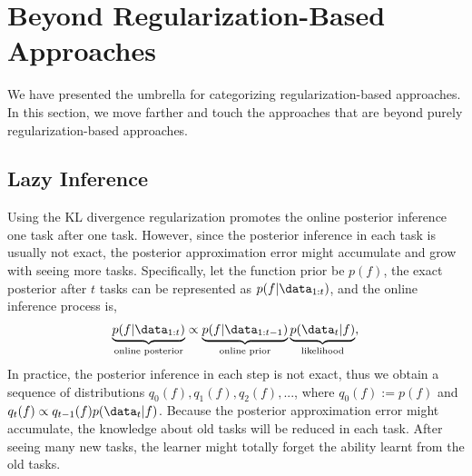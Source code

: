 \section{Beyond Regularization-Based Approaches}
We have presented the umbrella for categorizing regularization-based approaches. In this section, we move farther and touch the approaches that are beyond purely regularization-based approaches. 

\subsection{Lazy Inference}
Using the KL divergence regularization promotes the online posterior inference one task after one task. However, since the posterior inference in each task is usually not exact, the posterior approximation error might accumulate and grow with seeing more tasks. Specifically, let the function prior be $p(f)$, the exact posterior after $t$ tasks can be represented as $p(f | \data_{1:t})$, and the online inference process is,
\begin{align}
    \underbrace{p(f | \data_{1:t})}_{\text{online posterior}} \propto \underbrace{p(f | \data_{1:t-1})}_{\text{online prior}} \underbrace{p(\data_t | f)}_{\text{likelihood}},
\end{align}
In practice, the posterior inference in each step is not exact, thus we obtain a sequence of distributions $q_0(f), q_1(f), q_2(f), ...$, where  $q_0(f) := p(f)$ and $q_{t}(f) \propto q_{t-1}(f) p(\data_t|f)$. Because the posterior approximation error might accumulate, the knowledge about old tasks will be reduced in each task. After seeing many new tasks, the learner might totally forget the ability learnt from the old tasks. 


